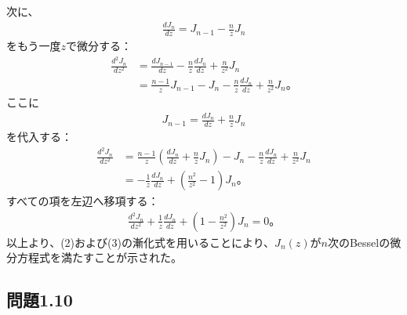 \documentclass[platex,dvipdfmx,a4paper]{jsarticle}
\newcommand{\bbn}[2]{\frac{d #1}{d #2}}
\newcommand{\nbbn}[3]{\frac{d^{#1} #2}{d #3^{#1}}}
\begin{document}
  次に、
  \begin{align*}
    \bbn{J_n}{z}
    =J_{n-1}-\frac{n}{z}J_n
  \end{align*}
  をもう一度$z$で微分する：
  \begin{align*}
    \nbbn{2}{J_n}{z}
    &=\bbn{J_{n-1}}{z}
    -\frac{n}{z}\bbn{J_n}{z}
    +\frac{n}{z^2}J_n\\
    &=\frac{n-1}{z}J_{n-1}-J_n
    -\frac{n}{z}\bbn{J_n}{z}
    +\frac{n}{z^2}J_n。
  \end{align*}
  ここに
  \begin{align*}
    J_{n-1}
    =\bbn{J_n}{z}+\frac{n}{z}J_n
  \end{align*}
  を代入する：
  \begin{align*}
    \nbbn{2}{J_n}{z}
    &=
    \frac{n-1}{z}
    \left(\bbn{J_n}{z}+\frac{n}{z}J_n\right)
    -J_n
    -\frac{n}{z}\bbn{J_n}{z}
    +\frac{n}{z^2}J_n\\
    &=-\frac{1}{z}\bbn{J_n}{z}
    +\left(\frac{n^2}{z^2}-1\right)J_n。
  \end{align*}
  すべての項を左辺へ移項する：
  \begin{align*}
    \nbbn{2}{J_n}{z}
    +\frac{1}{z}\bbn{J_n}{z}
    +\left(1-\frac{n^2}{z^2}\right)J_n
    =0。
  \end{align*}
  以上より、(2)および(3)の漸化式を用いることにより、$J_n(z)$が$n$次のBesselの微分方程式を満たすことが示された。

  \subsection*{問題1.10}
\end{document}
